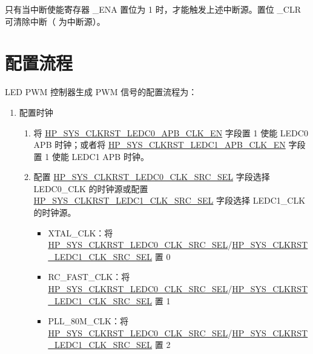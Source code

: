 \documentclass[main\_\_CN.tex]{subfiles}
\begin{document}
只有当中断使能寄存器 \_ENA 置位为 1 时，才能触发上述中断源。置位 \_CLR 可清除中断（ 为中断源）。


\section{配置流程}
\label{sec:ledc-prog-procedures}


LED PWM 控制器生成 PWM 信号的配置流程为：
\begin{enumerate}
    \item 配置时钟\label{sec:ledc-clk-cfg}
    \begin{enumerate}
    \item 将 \hyperref[fielddesc:HPSYSCLKRSTLEDC0APBCLKEN]{HP\_SYS\_CLKRST\_LEDC0\_APB\_CLK\_EN} 字段置 1 使能 LEDC0 APB 时钟；或者将 \hyperref[fielddesc:HPSYSCLKRSTLEDC1APBCLKEN]{HP\_SYS\_CLKRST\_LEDC1\_APB\_CLK\_EN} 字段置 1 使能 LEDC1 APB 时钟。
    \item 配置 \hyperref[fielddesc:HPSYSCLKRSTLEDC0CLKSRCSEL]{HP\_SYS\_CLKRST\_LEDC0\_CLK\_SRC\_SEL} 字段选择 LEDC0\_CLK 的时钟源或配置 \hyperref[fielddesc:HPSYSCLKRSTLEDC1CLKSRCSEL]{HP\_SYS\_CLKRST\_LEDC1\_CLK\_SRC\_SEL} 字段选择 LEDC1\_CLK 的时钟源。
    \begin{itemize}
    \item XTAL\_CLK：将 \hyperref[fielddesc:HPSYSCLKRSTLEDC0CLKSRCSEL]{HP\_SYS\_CLKRST\_LEDC0\_CLK\_SRC\_SEL}/\hyperref[fielddesc:HPSYSCLKRSTLEDC1CLKSRCSEL]{HP\_SYS\_CLKRST\_LEDC1\_CLK\_SRC\_SEL} 置 0
    \item RC\_FAST\_CLK：将 \hyperref[fielddesc:HPSYSCLKRSTLEDC0CLKSRCSEL]{HP\_SYS\_CLKRST\_LEDC0\_CLK\_SRC\_SEL}/\hyperref[fielddesc:HPSYSCLKRSTLEDC1CLKSRCSEL]{HP\_SYS\_CLKRST\_LEDC1\_CLK\_SRC\_SEL} 置 1
    \item PLL\_80M\_CLK：将 \hyperref[fielddesc:HPSYSCLKRSTLEDC0CLKSRCSEL]{HP\_SYS\_CLKRST\_LEDC0\_CLK\_SRC\_SEL}/\hyperref[fielddesc:HPSYSCLKRSTLEDC1CLKSRCSEL]{HP\_SYS\_CLKRST\_LEDC1\_CLK\_SRC\_SEL} 置 2
\end{itemize}


\end{enumerate}
\end{enumerate}
\end{document}
